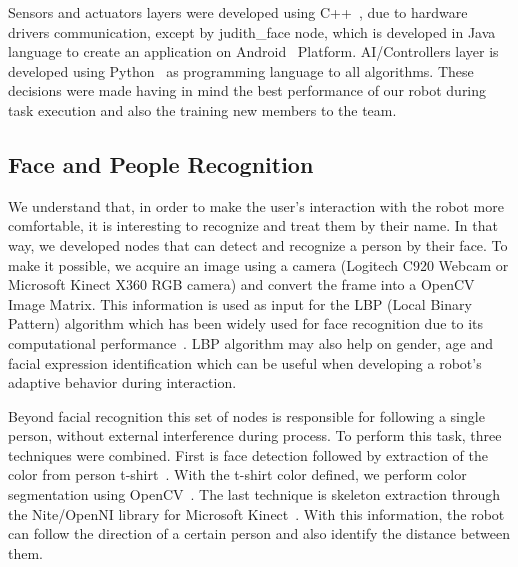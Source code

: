 Sensors and actuators layers were developed using C++~\cite{stroustrup:1986}, due to hardware drivers communication, except by judith\_face node, which is developed in Java~\cite{joy:2000} language to create an application on Android~\cite{android:2016} Platform. AI/Controllers layer is developed using Python~\cite{vanrossum:2010} as programming language to all algorithms. These decisions were made having in mind the best performance of our robot during task execution and also the training new members to the team.

\subsection{Face and People Recognition}\label{face-people-recognition}
We understand that, in order to make the user's interaction with the robot more comfortable, it is interesting to recognize and treat them by their name. In that way, we developed nodes that can detect and recognize a person by their face. To make it possible, we acquire an image using a camera (Logitech C920 Webcam or Microsoft Kinect X360 RGB camera) and convert the frame into a OpenCV~\cite{bradski:2000} Image Matrix. This information is used as input for the LBP (Local Binary Pattern) algorithm which has been widely used for face recognition due to its computational performance~\cite{ahonen:2006,yang:2007,shan:2012,ylioinas:2012,samadi:2013}. LBP algorithm may also help on gender, age and facial expression identification which can be useful when developing a robot's adaptive behavior during interaction.

Beyond facial recognition this set of nodes is responsible for following a single person, without external interference during process. To perform this task, three techniques were combined. First is face detection followed by extraction of the color from person t-shirt~\cite{pulli:2012,laganiere:2011,baggio:2012}. With the t-shirt color defined, we perform color segmentation using OpenCV~\cite{kang:2008,oliveira:2009,culjak:2012}. The last technique is skeleton extraction through the Nite/OpenNI library for Microsoft Kinect~\cite{openni:2011}. With this information, the robot can follow the direction of a certain person and also identify the distance between them.

